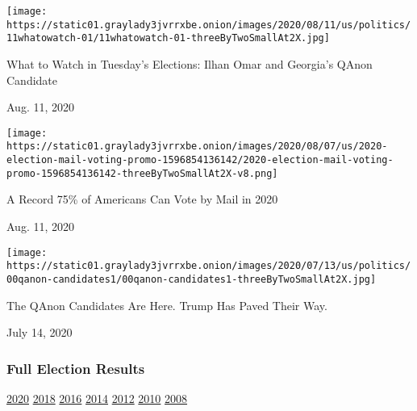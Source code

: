 \href{https://www.nytimes3xbfgragh.onion/2020/08/11/us/politics/ilhan-omar.html?action=click\&module=ELEX_results\&pgtype=Interactive\&region=RelatedCoverage}{}

\texttt{[image: https://static01.graylady3jvrrxbe.onion/images/2020/08/11/us/politics/11whatowatch-01/11whatowatch-01-threeByTwoSmallAt2X.jpg]}

What to Watch in Tuesday's Elections: Ilhan Omar and Georgia's QAnon
Candidate

Aug. 11, 2020

\href{https://www.nytimes3xbfgragh.onion/interactive/2020/08/11/us/politics/vote-by-mail-us-states.html?action=click\&module=ELEX_results\&pgtype=Interactive\&region=RelatedCoverage}{}

\texttt{[image: https://static01.graylady3jvrrxbe.onion/images/2020/08/07/us/2020-election-mail-voting-promo-1596854136142/2020-election-mail-voting-promo-1596854136142-threeByTwoSmallAt2X-v8.png]}

A Record 75\% of Americans Can Vote by Mail in 2020

Aug. 11, 2020

\href{https://www.nytimes3xbfgragh.onion/2020/07/14/us/politics/qanon-politicians-candidates.html?action=click\&module=ELEX_results\&pgtype=Interactive\&region=RelatedCoverage}{}

\texttt{[image: https://static01.graylady3jvrrxbe.onion/images/2020/07/13/us/politics/00qanon-candidates1/00qanon-candidates1-threeByTwoSmallAt2X.jpg]}

The QAnon Candidates Are Here. Trump Has Paved Their Way.

July 14, 2020

\hypertarget{full-election-results}{%
\subsubsection{Full Election Results}\label{full-election-results}}

\href{https://www.nytimes3xbfgragh.onion/interactive/2020/us/elections/delegate-count-primary-results.html?action=click\&module=ELEX_results\&pgtype=Interactive\&region=PastResultsFooter}{2020}
\href{https://www.nytimes3xbfgragh.onion/interactive/2018/us/elections/calendar-primary-results.html?action=click\&module=ELEX_results\&pgtype=Interactive\&region=PastResultsFooter}{2018}
\href{https://www.nytimes3xbfgragh.onion/elections/2016/results/president?action=click\&module=ELEX_results\&pgtype=Interactive\&region=PastResultsFooter}{2016}
\href{https://www.nytimes3xbfgragh.onion/elections/2014/results/senate?action=click\&module=ELEX_results\&pgtype=Interactive\&region=PastResultsFooter}{2014}
\href{https://www.nytimes3xbfgragh.onion/elections/2012/results/president.html?action=click\&module=ELEX_results\&pgtype=Interactive\&region=PastResultsFooter}{2012}
\href{https://www.nytimes3xbfgragh.onion/elections/2010/results/senate.html?action=click\&module=ELEX_results\&pgtype=Interactive\&region=PastResultsFooter}{2010}
\href{https://www.nytimes3xbfgragh.onion/elections/2008/results/president/map.html?action=click\&module=ELEX_results\&pgtype=Interactive\&region=PastResultsFooter}{2008}


